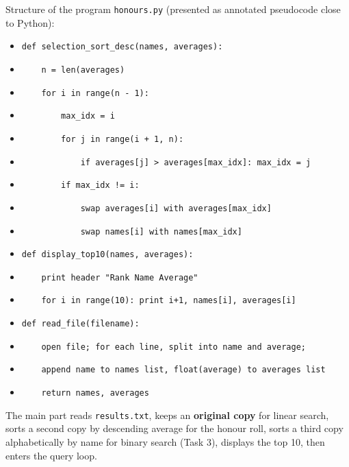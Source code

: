 \documentclass[11pt]{article}
\begin{document}
\begin{exemplebox}
Structure of the program \texttt{honours.py} (presented as annotated pseudocode close to Python):
\begin{itemize}
    \item \texttt{def selection\_sort\_desc(names, averages):}
    \item \texttt{~~~~n = len(averages)}
    \item \texttt{~~~~for i in range(n - 1):}
    \item \texttt{~~~~~~~~max\_idx = i}
    \item \texttt{~~~~~~~~for j in range(i + 1, n):}
    \item \texttt{~~~~~~~~~~~~if averages[j] > averages[max\_idx]: max\_idx = j}
    \item \texttt{~~~~~~~~if max\_idx != i:}
    \item \texttt{~~~~~~~~~~~~swap averages[i] with averages[max\_idx]}
    \item \texttt{~~~~~~~~~~~~swap names[i] with names[max\_idx]}
    \item \texttt{def display\_top10(names, averages):}
    \item \texttt{~~~~print header "Rank  Name  Average"}
    \item \texttt{~~~~for i in range(10): print i+1, names[i], averages[i]}
    \item \texttt{def read\_file(filename):}
    \item \texttt{~~~~open file; for each line, split into name and average;}
    \item \texttt{~~~~append name to names list, float(average) to averages list}
    \item \texttt{~~~~return names, averages}
\end{itemize}
The main part reads \texttt{results.txt}, keeps an \textbf{original copy} for linear search, sorts a second copy by descending average for the honour roll, sorts a third copy alphabetically by name for binary search (Task 3), displays the top 10, then enters the query loop.
\end{exemplebox}
\end{document}
